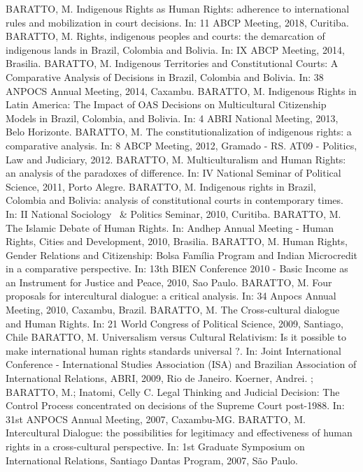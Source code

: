 \begin{cvcitems}
  \cvcitem
      {BARATTO, M.}
      {Indigenous Rights as Human Rights: adherence to international rules and mobilization in court decisions. In: 11 ABCP Meeting, 2018, Curitiba.}
  \cvcitem
      {BARATTO, M.}
      {Rights, indigenous peoples and courts: the demarcation of indigenous lands in Brazil, Colombia and Bolivia. In: IX ABCP Meeting, 2014, Brasilia.}
  \cvcitem
      {BARATTO, M.}
      {Indigenous Territories and Constitutional Courts: A Comparative Analysis of Decisions in Brazil, Colombia and Bolivia. In: 38 ANPOCS Annual Meeting, 2014, Caxambu.}
  \cvcitem
      {BARATTO, M.}
      {Indigenous Rights in Latin America: The Impact of OAS Decisions on Multicultural Citizenship Models in Brazil, Colombia, and Bolivia. In: 4 ABRI National Meeting, 2013, Belo Horizonte.}
  \cvcitem
      {BARATTO, M.}
      {The constitutionalization of indigenous rights: a comparative analysis. In: 8 ABCP Meeting, 2012, Gramado - RS. AT09 - Politics, Law and Judiciary, 2012.}
  \cvcitem
      {BARATTO, M.}
      {Multiculturalism and Human Rights: an analysis of the paradoxes of difference. In: IV National Seminar of Political Science, 2011, Porto Alegre.}
  \cvcitem
      {BARATTO, M.}
      {Indigenous rights in Brazil, Colombia and Bolivia: analysis of constitutional courts in contemporary times. In: II National Sociology \ & Politics Seminar, 2010, Curitiba.}
  \cvcitem
      {BARATTO, M.}
      {The Islamic Debate of Human Rights. In: Andhep Annual Meeting - Human Rights, Cities and Development, 2010, Brasilia.}
  \cvcitem
      {BARATTO, M.}
      {Human Rights, Gender Relations and Citizenship: Bolsa Família Program and Indian Microcredit in a comparative perspective. In: 13th BIEN Conference 2010 - Basic Income as an Instrument for Justice and Peace, 2010, Sao Paulo.}
  \cvcitem
      {BARATTO, M.}
      {Four proposals for intercultural dialogue: a critical analysis. In: 34 Anpocs Annual Meeting, 2010, Caxambu, Brazil.}
  \cvcitem
      {BARATTO, M.}
      {The Cross-cultural dialogue and Human Rights. In: 21 World Congress of Political Science, 2009, Santiago, Chile}
  \cvcitem
      {BARATTO, M.}
      {Universalism versus Cultural Relativism: Is it possible to make international human rights standards universal ?. In: Joint International Conference - International Studies Association (ISA) and Brazilian Association of International Relations, ABRI, 2009, Rio de Janeiro.}
  \cvcitem
      {Koerner, Andrei. ; BARATTO, M.; Inatomi, Celly C.}
      {Legal Thinking and Judicial Decision: The Control Process concentrated on decisions of the Supreme Court post-1988. In: 31st ANPOCS Annual Meeting, 2007, Caxambu-MG.}
  \cvcitem
      {BARATTO, M.}
      {Intercultural Dialogue: the possibilities for legitimacy and effectiveness of human rights in a cross-cultural perspective. In: 1st Graduate Symposium on International Relations, Santiago Dantas Program, 2007, São Paulo.}
\end{cvcitems}

